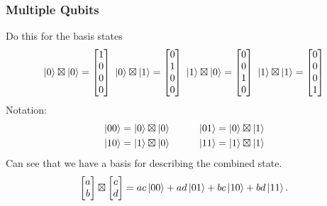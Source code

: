 \documentclass{beamer}
\theoremstyle{definition}
\begin{document}
\begin{frame}
\frametitle{Multiple Qubits}
Do this for the basis states 
\begin{align*}
\left\vert{0}\right\rangle\boxtimes \left\vert{0}\right\rangle
=
\begin{bmatrix}
1\\0\\0\\0
\end{bmatrix}\,\,\left\vert{0}\right\rangle\boxtimes \left\vert{1}\right\rangle
=
\begin{bmatrix}
0\\1\\0\\0
\end{bmatrix}\,\,\left\vert{1}\right\rangle\boxtimes \left\vert{0}\right\rangle
=
\begin{bmatrix}
0\\0\\1\\0
\end{bmatrix}\,\, \left\vert{1}\right\rangle\boxtimes \left\vert{1}\right\rangle
=
\begin{bmatrix}
0\\0\\0\\1
\end{bmatrix}
\end{align*}
\pause
Notation:
\begin{align*}
\left\vert{00}\right\rangle = \left\vert{0}\right\rangle \boxtimes \left\vert{0}\right\rangle\hspace{1cm}&
\left\vert{01}\right\rangle = \left\vert{0}\right\rangle \boxtimes \left\vert{1}\right\rangle\\
\left\vert{10}\right\rangle = \left\vert{1}\right\rangle \boxtimes \left\vert{0}\right\rangle\hspace{1cm}&
\left\vert{11}\right\rangle = \left\vert{1}\right\rangle \boxtimes \left\vert{1}\right\rangle
\end{align*}
\pause
Can see that we have a basis for describing the combined state.
\begin{align*}
\begin{bmatrix}
a\\b
\end{bmatrix}
\boxtimes
\begin{bmatrix}
c\\d
\end{bmatrix} = ac\left\vert{00}\right\rangle + ad\left\vert{01}\right\rangle + bc\left\vert{10}\right\rangle + bd\left\vert{11}\right\rangle. 
\end{align*}

\end{frame}



\end{document}
